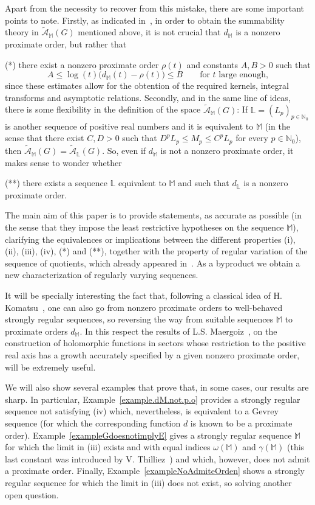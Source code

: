 \documentclass[11pt,a4paper]{article}
\theoremstyle{definition}
\def\o{\omega}
\def\ga{\gamma}
\def\N{\mathbb{N}}
\def\M{\mathbb{M}}
\def\L{\mathbb{L}} %
\begin{document}
Apart from the necessity to recover from this mistake, there are some important points to note. Firstly, as indicated in~\cite[Remark\ 4.11(iii)]{SanzFlat}, in order to obtain the summability theory in $\tilde{\mathcal{A}}_{\M}(G)$ mentioned above, it is not crucial that $d_{\M}$ is a nonzero proximate order, but rather that\par
(*) there exist a nonzero proximate order $\rho(t)$ and constants $A,B>0$ such that
\begin{equation*}
A\le \log(t)\big(d_{\M}(t)-\rho(t)\big)\le B\qquad \textrm{for $t$ large enough,}
\end{equation*}
since these estimates allow for the obtention of the required kernels, integral transforms and asymptotic relations. Secondly, and in the same line of ideas, there is some flexibility in the definition of the space $\tilde{\mathcal{A}}_{\M}(G)$: If $\L=(L_p)_{p\in\N_0}$ is another sequence of positive real numbers and it is equivalent to $\M$ (in the sense that there exist $C,D>0$ such that $D^p L_p \leq M_p \leq C^p L_p$ for every $p \in \N_0$), then $\tilde{\mathcal{A}}_{\M}(G)=\tilde{\mathcal{A}}_{\L}(G)$. So, even if $d_{\M}$ is not a nonzero proximate order, it makes sense to wonder whether\par
(**) there exists a sequence $\L$ equivalent to $\M$ and such that $d_{\L}$ is a nonzero proximate order.

The main aim of this paper is to provide statements, as accurate as possible (in the sense that they impose the least restrictive hypotheses on the sequence $\M$), clarifying the equivalences or implications between the different properties (i), (ii), (iii), (iv), (*) and (**), together with the property of regular variation of the sequence of quotients, which already appeared in~\cite{JimenezSanz}. As a byproduct we obtain a new characterization of regularly varying sequences.

It will be specially interesting the fact that, following a classical idea of H. Komatsu~\cite{komatsu}, one can also go from nonzero proximate orders to well-behaved strongly regular sequences, so reversing the way from suitable sequences $\M$ to proximate orders $d_{\M}$. In this respect the results of L.S. Maergoiz~\cite{Maergoiz}, on the construction of holomorphic functions in sectors whose restriction to the positive real axis has a growth accurately specified by a given nonzero proximate order, will be extremely useful.


We will also show several examples that prove that, in some cases, our results are sharp. In particular, Example~\ref{example.dM.not.p.o} provides a strongly regular sequence not satisfying (iv) which, nevertheless, is equivalent to a Gevrey sequence (for which the corresponding function $d$ is known to be a proximate order). Example~\ref{exampleGdoesnotimplyE} gives a strongly regular sequence $\M$ for which the limit in (iii) exists and with equal indices $\o(\M)$ and $\ga(\M)$ (this last constant was introduced by V. Thilliez~\cite{thilliez}) and which, however, does not admit a proximate order. Finally, Example~\ref{exampleNoAdmiteOrden} shows a strongly regular sequence for which the limit in (iii) does not exist, so solving another open question.
\end{document}

